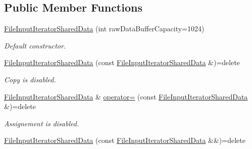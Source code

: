 \subsection*{Public Member Functions}
\begin{DoxyCompactItemize}
\item 
\hyperlink{class_mdt_1_1_plain_text_1_1_file_input_iterator_shared_data_a481b4eba3da74b1d7473b36e64ca372a}{File\+Input\+Iterator\+Shared\+Data} (int raw\+Data\+Buffer\+Capacity=1024)\hypertarget{class_mdt_1_1_plain_text_1_1_file_input_iterator_shared_data_a481b4eba3da74b1d7473b36e64ca372a}{}\label{class_mdt_1_1_plain_text_1_1_file_input_iterator_shared_data_a481b4eba3da74b1d7473b36e64ca372a}

\begin{DoxyCompactList}\small\item\em Default constructor. \end{DoxyCompactList}\item 
\hyperlink{class_mdt_1_1_plain_text_1_1_file_input_iterator_shared_data_a801c96b3ccddd767cfcdabca6e0f388f}{File\+Input\+Iterator\+Shared\+Data} (const \hyperlink{class_mdt_1_1_plain_text_1_1_file_input_iterator_shared_data}{File\+Input\+Iterator\+Shared\+Data} \&)=delete\hypertarget{class_mdt_1_1_plain_text_1_1_file_input_iterator_shared_data_a801c96b3ccddd767cfcdabca6e0f388f}{}\label{class_mdt_1_1_plain_text_1_1_file_input_iterator_shared_data_a801c96b3ccddd767cfcdabca6e0f388f}

\begin{DoxyCompactList}\small\item\em Copy is disabled. \end{DoxyCompactList}\item 
\hyperlink{class_mdt_1_1_plain_text_1_1_file_input_iterator_shared_data}{File\+Input\+Iterator\+Shared\+Data} \& \hyperlink{class_mdt_1_1_plain_text_1_1_file_input_iterator_shared_data_a1a49a2fb26a1165f1b785b9bab46f5e8}{operator=} (const \hyperlink{class_mdt_1_1_plain_text_1_1_file_input_iterator_shared_data}{File\+Input\+Iterator\+Shared\+Data} \&)=delete\hypertarget{class_mdt_1_1_plain_text_1_1_file_input_iterator_shared_data_a1a49a2fb26a1165f1b785b9bab46f5e8}{}\label{class_mdt_1_1_plain_text_1_1_file_input_iterator_shared_data_a1a49a2fb26a1165f1b785b9bab46f5e8}

\begin{DoxyCompactList}\small\item\em Assignement is disabled. \end{DoxyCompactList}\item 
\hyperlink{class_mdt_1_1_plain_text_1_1_file_input_iterator_shared_data_a1788932d201f21a9cc294ef8237c2d0f}{File\+Input\+Iterator\+Shared\+Data} (const \hyperlink{class_mdt_1_1_plain_text_1_1_file_input_iterator_shared_data}{File\+Input\+Iterator\+Shared\+Data} \&\&)=delete\hypertarget{class_mdt_1_1_plain_text_1_1_file_input_iterator_shared_data_a1788932d201f21a9cc294ef8237c2d0f}{}\label{class_mdt_1_1_plain_text_1_1_file_input_iterator_shared_data_a1788932d201f21a9cc294ef8237c2d0f}


\end{DoxyCompactItemize}
